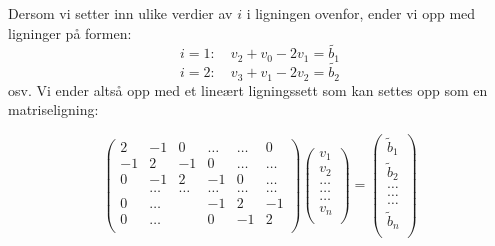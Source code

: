 \documentclass{article}
\begin{document}
Dersom vi setter inn ulike verdier av $i$ i ligningen ovenfor, ender vi opp med ligninger på formen:
\[i=1: \quad v_2 + v_0 - 2v_1 = \tilde{b_1}\]
\[i=2: \quad v_3 + v_1 -2v_2 = \tilde{b_2}\]
osv.
Vi ender altså opp med et lineært ligningssett som kan settes opp som en matriseligning:

\begin{equation}
    \left(\begin{array}{cccccc}
                           2& -1& 0 &\dots   & \dots &0 \\
                           -1 & 2 & -1 &0 &\dots &\dots \\
                           0&-1 &2 & -1 & 0 & \dots \\
                           & \dots   & \dots &\dots   &\dots & \dots \\
                           0&\dots   &  &-1 &2& -1 \\
                           0&\dots    &  & 0  &-1 & 2 \\
                      \end{array} \right)\left(\begin{array}{c}
                           v_1\\
                           v_2\\
                           \dots \\
                          \dots  \\
                          \dots \\
                           v_n\\
                      \end{array} \right)
  =\left(\begin{array}{c}
                           \tilde{b}_1\\
                           \tilde{b}_2\\
                           \dots \\
                           \dots \\
                          \dots \\
                           \tilde{b}_n\\
                      \end{array} \right)
\end{equation}
\end{document}
